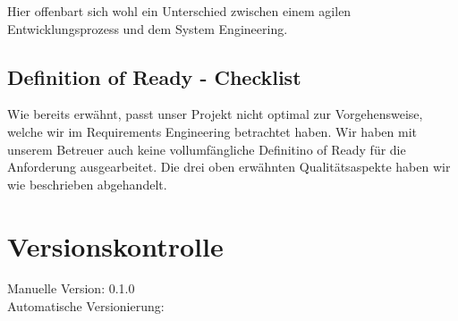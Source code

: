 \documentclass[11pt,titelpage]{scrartcl}
\begin{document}
Hier offenbart sich wohl ein Unterschied zwischen  einem agilen Entwicklungsprozess und dem System Engineering.
\subsection{Definition of Ready - Checklist}
Wie bereits erwähnt, passt unser Projekt nicht optimal zur Vorgehensweise, welche wir im Requirements Engineering betrachtet haben. Wir haben mit unserem Betreuer auch keine vollumfängliche Definitino of Ready für die Anforderung ausgearbeitet. Die drei oben erwähnten Qualitätsaspekte haben wir wie beschrieben abgehandelt. 
\section{Versionskontrolle}
Manuelle Version: 0.1.0
\\

\noindent
Automatische Versionierung:
\immediate{}

\immediate{}
\end{document}
